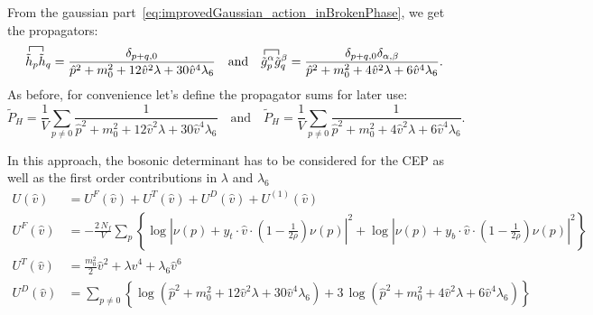 From the gaussian part~\eqref{eq:improvedGaussian_action_inBrokenPhase}, we get the propagators:
\begin{equation}
    \label{eq:prop_HiggsAndGoldstone_improved_inBrokenPhase}
 \contraction{}{\tilde h}{{}_p}{\tilde h{}}  \tilde h_p \tilde h_q = 
                              \frac{ \delta_{p+q,0}}{\hat p^2 + m_0^2 + 12 \hat v^2 \lambda + 30 \hat v^4 \lambda_6 } \quad \text{and} \quad
 \contraction{}{\tilde g}{{}^{\alpha}_p}{\tilde g{}}  \tilde g^{\alpha}_p \tilde g^{\beta}_q = 
                              \frac{ \delta_{p+q,0} \delta_{\alpha,\beta}}{\hat p^2 + m_0^2 + 4 \hat v^2 \lambda + 6 \hat v^4 \lambda_6 }.
\end{equation}
As before, for convenience let's define the propagator sums for later use:
\begin{equation}\label{eq:propagatorSum_improved_inBrokenPhase}
\tilde P_H = \frac{1}{V} \sum\limits_{p\neq 0} \frac{1}{ \hat p^2 + m_0^2 + 12 \hat v^2 \lambda + 30 \hat v^4 \lambda_6 } \quad\text{and}\quad
\tilde P_H = \frac{1}{V} \sum\limits_{p\neq 0} \frac{1}{ \hat p^2 + m_0^2 + 4 \hat v^2 \lambda + 6 \hat v^4 \lambda_6 }.
\end{equation}

In this approach, the bosonic determinant has to be considered for the CEP as well as the first order contributions in $\lambda$ and $\lambda_6$
\begin{align}
      \label{eq:CEP_improved_inBrokenPhase_all}
 U(\hat v) & = U^F(\hat v) + U^T(\hat v) + U^D(\hat v) + U^{(1)}(\hat v) 
            \\
      \label{eq:CEP_improved_inBrokenPhase_Fermion}
 U^F(\hat v) & = -\frac{2\, N_f}{V} \sum\limits_p \left\{
                  \log\left| \nu(p) + y_t \cdot \hat v \cdot \left( 1-\frac{1}{2 \rho} \right) \nu(p) \right|^2 +
                  \log\left| \nu(p) + y_b \cdot \hat v \cdot \left( 1-\frac{1}{2 \rho} \right) \nu(p) \right|^2 \right\}
            \\
      \label{eq:CEP_improved_inBrokenPhase_Tree}
 U^T(\hat v) & = \frac{m_0^2}{2} \hat v^2 + \lambda \hat v^4 + \lambda_6 \hat v^6
             \\
      \label{eq:CEP_improved_inBrokenPhase_BosDet}
 U^D(\hat v) & = \sum\limits_{p \neq 0} \left\{
                  \log \left( \hat p^2 + m_0^2 + 12 \hat v^2 \lambda + 30 \hat v^4 \lambda_6 \right) + 
                  3\, \log \left( \hat p^2 + m_0^2 + 4 \hat v^2 \lambda + 6 \hat v^4 \lambda_6 \right) \right\}
\end{align}
